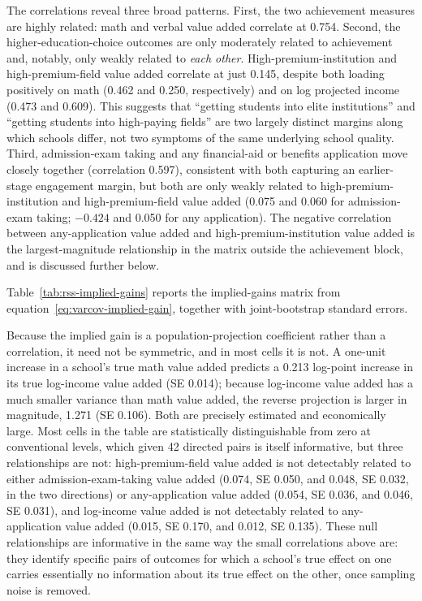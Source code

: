\documentclass[a4paper, article, english, oneside, unknownkeysallowed, 12pt]{memoir}
\begin{document}
The correlations reveal three broad patterns.
First, the two achievement measures are highly related: math and verbal value added correlate at 0.754.
Second, the higher-education-choice outcomes are only moderately related to achievement and, notably, only weakly related to \emph{each other}.
High-premium-institution and high-premium-field value added correlate at just 0.145, despite both loading positively on math (0.462 and 0.250, respectively) and on log projected income (0.473 and 0.609).
This suggests that ``getting students into elite institutions'' and ``getting students into high-paying fields'' are two largely distinct margins along which schools differ, not two symptoms of the same underlying school quality.
Third, admission-exam taking and any financial-aid or benefits application move closely together (correlation 0.597), consistent with both capturing an earlier-stage engagement margin, but both are only weakly related to high-premium-institution and high-premium-field value added (0.075 and 0.060 for admission-exam taking; $-0.424$ and 0.050 for any application).
The negative correlation between any-application value added and high-premium-institution value added is the largest-magnitude relationship in the matrix outside the achievement block, and is discussed further below.

Table~\ref{tab:rss-implied-gains} reports the implied-gains matrix from equation~\eqref{eq:varcov-implied-gain}, together with joint-bootstrap standard errors.



Because the implied gain is a population-projection coefficient rather than a correlation, it need not be symmetric, and in most cells it is not.
A one-unit increase in a school's true math value added predicts a 0.213 log-point increase in its true log-income value added (SE 0.014); because log-income value added has a much smaller variance than math value added, the reverse projection is larger in magnitude, 1.271 (SE 0.106).
Both are precisely estimated and economically large.
Most cells in the table are statistically distinguishable from zero at conventional levels, which given 42 directed pairs is itself informative, but three relationships are not: high-premium-field value added is not detectably related to either admission-exam-taking value added (0.074, SE 0.050, and 0.048, SE 0.032, in the two directions) or any-application value added (0.054, SE 0.036, and 0.046, SE 0.031), and log-income value added is not detectably related to any-application value added (0.015, SE 0.170, and 0.012, SE 0.135).
These null relationships are informative in the same way the small correlations above are: they identify specific pairs of outcomes for which a school's true effect on one carries essentially no information about its true effect on the other, once sampling noise is removed.
\end{document}
